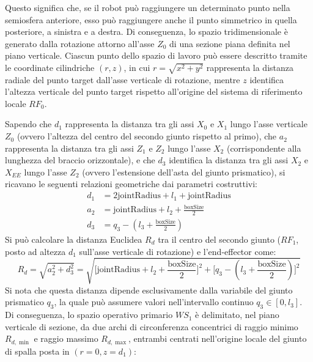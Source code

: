 ﻿\documentclass[11pt, a4paper]{article}
\begin{document}
Questo significa che, se il robot può raggiungere un determinato punto nella semiosfera anteriore, esso può raggiungere anche il punto simmetrico in quella posteriore, a sinistra e a destra. Di conseguenza, lo spazio tridimensionale è generato dalla rotazione attorno all'asse $Z_0$ di una sezione piana definita nel piano verticale. Ciascun punto dello spazio di lavoro può essere descritto tramite le coordinate cilindriche $(r, z)$, in cui $r = \sqrt{x^2 + y^2}$ rappresenta la distanza radiale del punto target dall'asse verticale di rotazione, mentre $z$ identifica l'altezza verticale del punto target rispetto all'origine del sistema di riferimento locale $RF_0$.

Sapendo che $d_{1}$ rappresenta la distanza tra gli assi $X_{0}$ e $X_{1}$ lungo l'asse verticale $Z_{0}$ (ovvero l'altezza del centro del secondo giunto rispetto al primo), che $a_{2}$ rappresenta la distanza tra gli assi $Z_{1}$ e $Z_{2}$ lungo l'asse $X_{2}$ (corrispondente alla lunghezza del braccio orizzontale), e che $d_{3}$ identifica la distanza tra gli assi $X_{2}$ e $X_{EE}$ lungo l'asse $Z_{2}$ (ovvero l'estensione dell'asta del giunto prismatico), si ricavano le seguenti relazioni geometriche dai parametri costruttivi:
\begin{align*}
    d_{1} &= 2\text{jointRadius} + l_{1} + \text{jointRadius} \\
    a_{2} &= \text{jointRadius} + l_{2} + \frac{\text{boxSize}}{2} \\
    d_{3} &= q_{3} - \left(l_{3} + \frac{\text{boxSize}}{2}\right)
\end{align*}
Si può calcolare la distanza Euclidea $R_{d}$ tra il centro del secondo giunto ($RF_1$, posto ad altezza $d_1$ sull'asse verticale di rotazione) e l'end-effector come:
\[
  R_{d} = \sqrt{a_2^2 + d_3^2} = \sqrt{\biggl[ \text{jointRadius} + l_{2} + \frac{\text{boxSize}}{2} \biggr]^{2} +  \biggl[ q_{3} - \left(l_{3} + \frac{\text{boxSize}}{2}\right) \biggr]^{2}}
\]
Si nota che questa distanza dipende esclusivamente dalla variabile del giunto prismatico $q_{3}$, la quale può assumere valori nell'intervallo continuo $q_3 \in [0, l_{3}]$. Di conseguenza, lo spazio operativo primario $WS_1$ è delimitato, nel piano verticale di sezione, da due archi di circonferenza concentrici di raggio minimo $R_{d,\min}$ e raggio massimo $R_{d,\max}$, entrambi centrati nell'origine locale del giunto di spalla posta in $(r=0, z=d_1)$:
\end{document}

